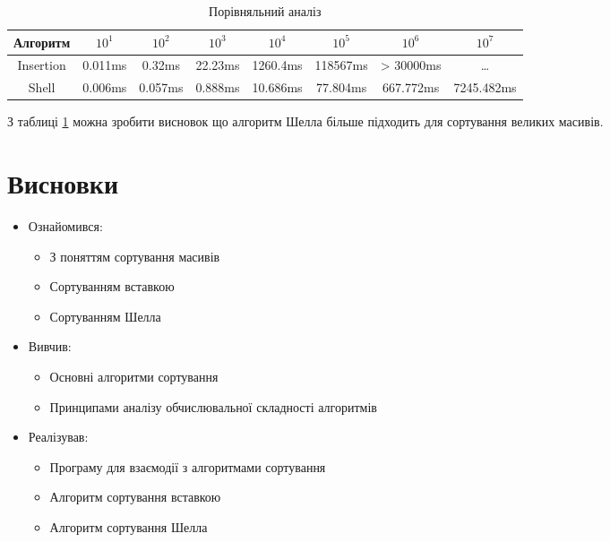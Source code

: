 \begin{table}[H]
	\centering
	\caption{Порівняльний аналіз}
	\label{tab:analis}
	\begin{tabular}{cccccccc}
		\toprule
		Алгоритм &\(10^1\) &\(10^2\)&\(10^3\)&\(10^4\)&\(10^5\)&\(10^6\)&\(10^7\)\\
		\midrule
		Insertion & 0.011ms & 0.32ms & 22.23ms & 1260.4ms & 118567ms & > 30000ms & \dots\\
		Shell & 0.006ms & 0.057ms & 0.888ms & 10.686ms & 77.804ms & 667.772ms & 7245.482ms\\
		\bottomrule
	\end{tabular}
\end{table}
З таблиці \ref{tab:analis} можна зробити висновок що алгоритм Шелла більше підходить для сортування великих масивів.

\section{Висновки}
\begin{itemize}
	\item Ознайомився:
		\begin{itemize}
			\item З поняттям сортування масивів
			\item Сортуванням вставкою
			\item  Сортуванням Шелла
		\end{itemize}
	\item Вивчив:
		\begin{itemize}
			\item Основні алгоритми сортування
			\item Принципами аналізу обчислювальної складності алгоритмів
		\end{itemize}
	\item Реалізував:
		\begin{itemize}
			\item Програму для взаємодії з алгоритмами сортування
			\item Алгоритм сортування вставкою
			\item Алгоритм сортування Шелла
		\end{itemize}
\end{itemize}